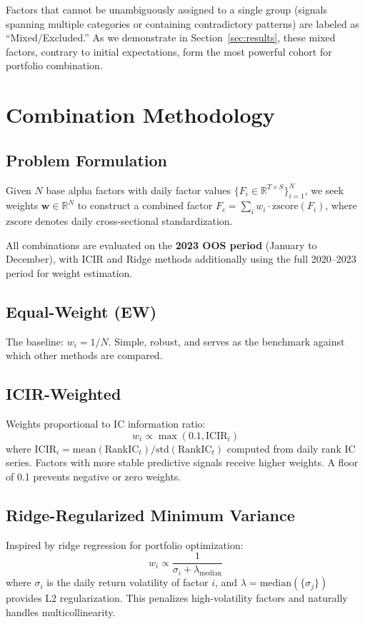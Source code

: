 \documentclass[11pt,a4paper]{ctexart}
\begin{document}
Factors that cannot be unambiguously assigned to a single group (signals spanning multiple categories or containing contradictory patterns) are labeled as ``Mixed/Excluded.'' As we demonstrate in Section~\ref{sec:results}, these mixed factors, contrary to initial expectations, form the most powerful cohort for portfolio combination.

\section{Combination Methodology}

\subsection{Problem Formulation}

Given $N$ base alpha factors with daily factor values $\{F_i \in \mathbb{R}^{T \times S}\}_{i=1}^N$, we seek weights $\mathbf{w} \in \mathbb{R}^N$ to construct a combined factor $F_c = \sum_i w_i \cdot \text{zscore}(F_i)$, where $\text{zscore}$ denotes daily cross-sectional standardization.

All combinations are evaluated on the \textbf{2023 OOS period} (January to December), with ICIR and Ridge methods additionally using the full 2020--2023 period for weight estimation.

\subsection{Equal-Weight (EW)}
The baseline: $w_i = 1/N$. Simple, robust, and serves as the benchmark against which other methods are compared.

\subsection{ICIR-Weighted}
Weights proportional to IC information ratio:
\begin{equation}
w_i \propto \max(0.1, \text{ICIR}_i)
\end{equation}
where $\text{ICIR}_i = \text{mean}(\text{RankIC}_t) / \text{std}(\text{RankIC}_t)$ computed from daily rank IC series. Factors with more stable predictive signals receive higher weights. A floor of 0.1 prevents negative or zero weights.

\subsection{Ridge-Regularized Minimum Variance}
Inspired by ridge regression for portfolio optimization:
\begin{equation}
w_i \propto \frac{1}{\sigma_i + \lambda_{\text{median}}}
\end{equation}
where $\sigma_i$ is the daily return volatility of factor $i$, and $\lambda = \text{median}(\{\sigma_j\})$ provides L2 regularization. This penalizes high-volatility factors and naturally handles multicollinearity.
\end{document}
